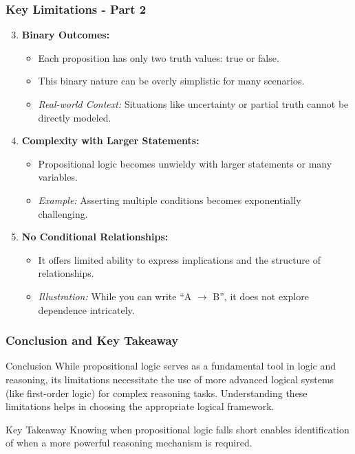 \documentclass[aspectratio=169]{beamer}
\begin{document}
\begin{frame}[fragile]
    \frametitle{Key Limitations - Part 2}
    \begin{enumerate}
        \setcounter{enumi}{2}
        \item \textbf{Binary Outcomes:}
        \begin{itemize}
            \item Each proposition has only two truth values: true or false.
            \item This binary nature can be overly simplistic for many scenarios.
            \item \textit{Real-world Context:} Situations like uncertainty or partial truth cannot be directly modeled.
        \end{itemize}

        \item \textbf{Complexity with Larger Statements:}
        \begin{itemize}
            \item Propositional logic becomes unwieldy with larger statements or many variables.
            \item \textit{Example:} Asserting multiple conditions becomes exponentially challenging.
        \end{itemize}

        \item \textbf{No Conditional Relationships:}
        \begin{itemize}
            \item It offers limited ability to express implications and the structure of relationships.
            \item \textit{Illustration:} While you can write ``A $\rightarrow$ B'', it does not explore dependence intricately.
        \end{itemize}
    \end{enumerate}
\end{frame}

\begin{frame}[fragile]
    \frametitle{Conclusion and Key Takeaway}
    \begin{block}{Conclusion}
        While propositional logic serves as a fundamental tool in logic and reasoning, its limitations necessitate the use of more advanced logical systems (like first-order logic) for complex reasoning tasks. Understanding these limitations helps in choosing the appropriate logical framework.
    \end{block}
    
    \begin{block}{Key Takeaway}
        Knowing when propositional logic falls short enables identification of when a more powerful reasoning mechanism is required.
    \end{block}
\end{frame}
\end{document}
